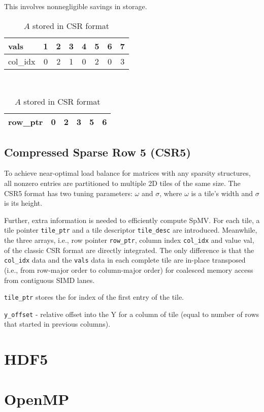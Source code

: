 \documentclass[thesis=M,english]{FITthesis}[2019/12/23]
\begin{document}
This involves nonnegligible savings in storage.

\begin{table}[h!]
	\centering
	\begin{tabular}{ |l||c|c|c|c|c|c|c| }
		\hline
		vals     & 1 & 2 & 3 & 4 & 5 & 6 & 7 \\
		\hline
		col\_idx & 0 & 2 & 1 & 0 & 2 & 0 & 3 \\
		\hline
	\end{tabular} \\
	\begin{tabular}{ |l||c|c|c|c|c| }
		\hline
		row\_ptr & 0 & 2 & 3 & 5 & 6 \\
		\hline
	\end{tabular}
	\caption{$A$ stored in CSR format}
\end{table}

\section{Compressed Sparse Row 5 (CSR5)}

To achieve near-optimal load balance for matrices with any sparsity structures,
all nonzero entries are partitioned to multiple 2D tiles of the same size.
The CSR5 format has two tuning parameters: $\omega$ and $\sigma$, where $\omega$
is a tile’s width and $\sigma$ is its height. \cite{liu2015csr5}

Further, extra information is needed to efficiently compute
SpMV. For each tile, a tile pointer \lstinline!tile_ptr! and a tile descriptor \lstinline!tile_desc! are introduced.
Meanwhile, the three arrays, i.e., row pointer \lstinline!row_ptr!, column index \lstinline!col_idx! and value val,
of the classic CSR format are directly integrated. The only difference is that the \lstinline!col_idx! data and the \lstinline!vals!
data in each complete tile are in-place transposed (i.e., from row-major order to column-major order) for coalesced memory access from contiguous SIMD lanes.

\lstinline!tile_ptr! stores the for index of the first entry of the tile.

\lstinline!y_offset! - relative offset into the Y for a column of tile (equal to number of rows that started in previous columns).

\chapter{HDF5}
\chapter{OpenMP}
\end{document}

